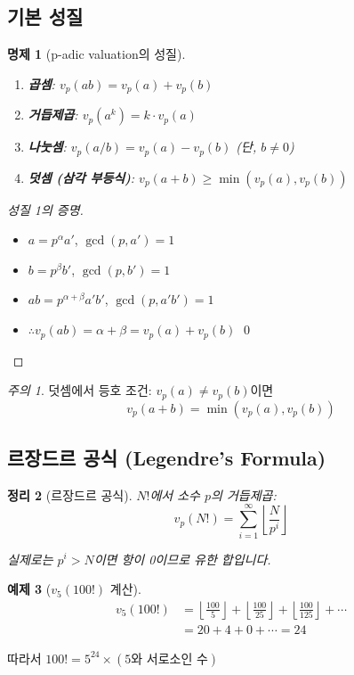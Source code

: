 \documentclass[11pt,a4paper]{article}
\newtheorem{theorem}{정리}[section]
\newtheorem{proposition}[theorem]{명제}
\theoremstyle{definition}
\newtheorem{example}[theorem]{예제}
\theoremstyle{remark}
\newtheorem*{remark}{주의}
\begin{document}
\subsection{기본 성질}

\begin{proposition}[p-adic valuation의 성질]
\begin{enumerate}
    \item \textbf{곱셈}: $v_p(ab) = v_p(a) + v_p(b)$
    \item \textbf{거듭제곱}: $v_p(a^k) = k \cdot v_p(a)$
    \item \textbf{나눗셈}: $v_p(a/b) = v_p(a) - v_p(b)$ (단, $b \neq 0$)
    \item \textbf{덧셈 (삼각 부등식)}: $v_p(a + b) \geq \min(v_p(a), v_p(b))$
\end{enumerate}
\end{proposition}

\begin{proof}[성질 1의 증명]
\begin{itemize}
    \item $a = p^{\alpha} a'$, $\gcd(p, a') = 1$
    \item $b = p^{\beta} b'$, $\gcd(p, b') = 1$
    \item $ab = p^{\alpha + \beta} a'b'$, $\gcd(p, a'b') = 1$
    \item $\therefore v_p(ab) = \alpha + \beta = v_p(a) + v_p(b)$ \qed
\end{itemize}
\end{proof}

\begin{remark}
덧셈에서 등호 조건: $v_p(a) \neq v_p(b)$이면
\[v_p(a + b) = \min(v_p(a), v_p(b))\]
\end{remark}

\subsection{르장드르 공식 (Legendre's Formula)}

\begin{theorem}[르장드르 공식]
$N!$에서 소수 $p$의 거듭제곱:
\[v_p(N!) = \sum_{i=1}^{\infty} \left\lfloor \frac{N}{p^i} \right\rfloor\]

실제로는 $p^i > N$이면 항이 0이므로 유한 합입니다.
\end{theorem}

\begin{example}[$v_5(100!)$ 계산]
\begin{align*}
v_5(100!) &= \left\lfloor \frac{100}{5} \right\rfloor + \left\lfloor \frac{100}{25} \right\rfloor + \left\lfloor \frac{100}{125} \right\rfloor + \cdots \\
&= 20 + 4 + 0 + \cdots = 24
\end{align*}

따라서 $100! = 5^{24} \times (\text{5와 서로소인 수})$
\end{example}
\end{document}
